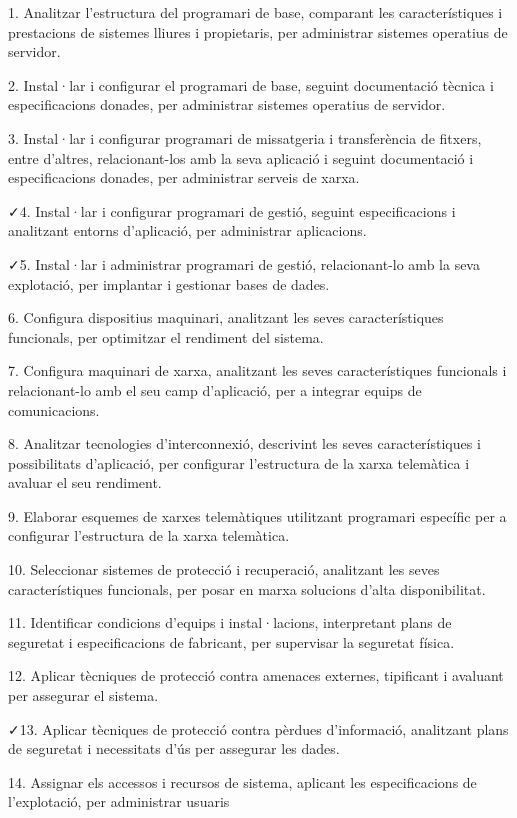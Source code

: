 \documentclass[catalan, a4paper, 12pt, titlepage]{article}
\begin{document}
1. Analitzar l'estructura del programari de base, comparant les característiques i prestacions de sistemes lliures i propietaris, per administrar sistemes operatius de servidor.

2. Instal·lar i configurar el programari de base, seguint documentació tècnica i especificacions donades, per administrar sistemes operatius de servidor.

3. Instal·lar i configurar programari de missatgeria i transferència de fitxers, entre d'altres, relacionant-los amb la seva aplicació i seguint documentació i especificacions donades, per administrar serveis de xarxa.

\faCheck 4. Instal·lar i configurar programari de gestió, seguint especificacions i analitzant entorns d'aplicació, per administrar aplicacions.

\faCheck 5. Instal·lar i administrar programari de gestió, relacionant-lo amb la seva explotació, per implantar i gestionar bases de dades.

6. Configura dispositius maquinari, analitzant les seves característiques funcionals, per optimitzar el rendiment del sistema.

7. Configura maquinari de xarxa, analitzant les seves característiques funcionals i relacionant-lo amb el seu camp d'aplicació, per a integrar equips de comunicacions.

8. Analitzar tecnologies d'interconnexió, descrivint les seves característiques i possibilitats d'aplicació, per configurar l'estructura de la xarxa telemàtica i avaluar el seu rendiment.

9. Elaborar esquemes de xarxes telemàtiques utilitzant programari específic per a configurar l'estructura de la xarxa telemàtica.

10. Seleccionar sistemes de protecció i recuperació, analitzant les seves característiques funcionals, per posar en marxa solucions d'alta disponibilitat.

11. Identificar condicions d'equips i instal·lacions, interpretant plans de seguretat i especificacions de fabricant, per supervisar la seguretat física.

12. Aplicar tècniques de protecció contra amenaces externes, tipificant i avaluant per assegurar el sistema.

\faCheck 13. Aplicar tècniques de protecció contra pèrdues d'informació, analitzant plans de seguretat i necessitats d'ús per assegurar les dades.

14. Assignar els accessos i recursos de sistema, aplicant les especificacions de l'explotació, per administrar usuaris
\end{document}
